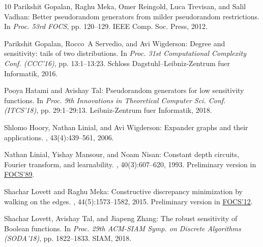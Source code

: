 \documentclass[11pt]{article}
\numberwithin{equation}{section}
\theoremstyle{definition}
\theoremstyle{plain}
\begin{document}
\begin{thebibliography}{10}
{\sc Parikshit Gopalan, Raghu Meka, Omer Reingold, Luca Trevisan, and Salil
  Vadhan}: Better pseudorandom generators from milder pseudorandom
  restrictions.
\newblock In {\em Proc. 53rd FOCS}, pp. 120--129. IEEE Comp. Soc. Press, 2012.

{\sc Parikshit Gopalan, Rocco~A Servedio, and Avi Wigderson}: Degree and
  sensitivity: tails of two distributions.
\newblock In {\em Proc. 31st Computational Complexity Conf. (CCC'16)}, pp.
  13:1--13:23. Schloss Dagstuhl--Leibniz-Zentrum fuer Informatik, 2016.

{\sc Pooya Hatami and Avishay Tal}: Pseudorandom generators for low sensitivity
  functions.
\newblock In {\em Proc. 9th Innovations in Theoretical Computer Sci. Conf.
  (ITCS'18)}, pp. 29:1--29:13. Leibniz-Zentrum fuer Informatik, 2018.

{\sc Shlomo Hoory, Nathan Linial, and Avi Wigderson}: Expander graphs and their
  applications.
, 43(4):439--561, 2006.
\newblock [\epfmtdoi{10.1090/S0273-0979-06-01126-8}]

{\sc Nathan Linial, Yishay Mansour, and Noam Nisan}: Constant depth circuits,
  {F}ourier transform, and learnability.
, 40(3):607--620, 1993.
\newblock Preliminary version in
  \href{https://ieeexplore.ieee.org/document/63537}{FOCS'89}.
\newblock [\epfmtdoi{10.1145/174130.174138}]

{\sc Shachar Lovett and Raghu Meka}: Constructive discrepancy minimization by
  walking on the edges.
, 44(5):1573--1582, 2015.
\newblock Preliminary version in
  \href{https://ieeexplore.ieee.org/document/6375282}{FOCS'12}.

{\sc Shachar Lovett, Avishay Tal, and Jiapeng Zhang}: The robust sensitivity of
  {B}oolean functions.
\newblock In {\em Proc. 29th ACM-SIAM Symp. on Discrete Algorithms (SODA'18)},
  pp. 1822--1833. SIAM, 2018.
\newblock [\epfmtdoi{10.1137/1.9781611975031.119}]


\end{thebibliography}
\end{document}

